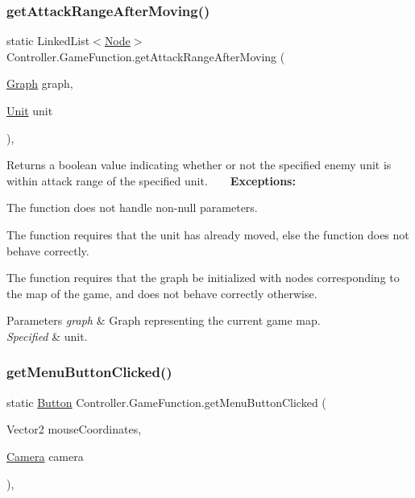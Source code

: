\subsubsection{\texorpdfstring{get\+Attack\+Range\+After\+Moving()}{getAttackRangeAfterMoving()}}
{\footnotesize\ttfamily static Linked\+List$<$\hyperlink{class_model_1_1_map_module_1_1_node}{Node}$>$ Controller.\+Game\+Function.\+get\+Attack\+Range\+After\+Moving (\begin{DoxyParamCaption}\item[{\hyperlink{class_model_1_1_map_module_1_1_graph}{Graph}}]{graph,  }\item[{\hyperlink{interface_model_1_1_unit_module_1_1_unit}{Unit}}]{unit }\end{DoxyParamCaption})\hspace{0.3cm}{\ttfamily [inline]}, {\ttfamily [static]}}

Returns a boolean value indicating whether or not the specified enemy unit is within attack range of the specified unit. ~\newline
~\newline
 {\bfseries Exceptions\+:} ~\newline

\begin{DoxyItemize}
\item The function does not handle non-\/null parameters.
\item The function requires that the unit has already moved, else the function does not behave correctly.
\item The function requires that the graph be initialized with nodes corresponding to the map of the game, and does not behave correctly otherwise. 
\begin{DoxyParams}{Parameters}
{\em graph} & Graph representing the current game map. \\
\hline
{\em Specified} & unit. \\
\hline
\end{DoxyParams}

\end{DoxyItemize}\hypertarget{class_controller_1_1_game_function_ae76737ddf87cf0ca533ac317da7c5ef3}{}\label{class_controller_1_1_game_function_ae76737ddf87cf0ca533ac317da7c5ef3} 
\subsubsection{\texorpdfstring{get\+Menu\+Button\+Clicked()}{getMenuButtonClicked()}}
{\footnotesize\ttfamily static \hyperlink{class_model_1_1_button}{Button} Controller.\+Game\+Function.\+get\+Menu\+Button\+Clicked (\begin{DoxyParamCaption}\item[{Vector2}]{mouse\+Coordinates,  }\item[{\hyperlink{class_view_1_1_camera}{Camera}}]{camera }\end{DoxyParamCaption})\hspace{0.3cm}{\ttfamily [inline]}, {\ttfamily [static]}}

